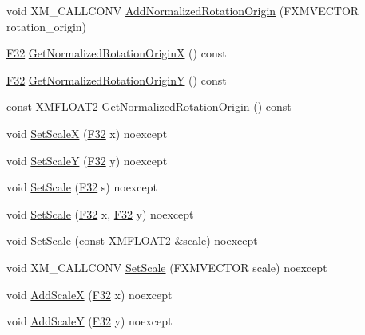 \begin{DoxyCompactItemize}
\item 
void X\+M\+\_\+\+C\+A\+L\+L\+C\+O\+NV \hyperlink{classmage_1_1_sprite_transform_a5571cc3e5700aba23f8c229675f10c3e}{Add\+Normalized\+Rotation\+Origin} (F\+X\+M\+V\+E\+C\+T\+OR rotation\+\_\+origin)
\item 
\hyperlink{namespacemage_aa97e833b45f06d60a0a9c4fc22ae02c0}{F32} \hyperlink{classmage_1_1_sprite_transform_a44a0577d7c136650027da9f5b8a6be77}{Get\+Normalized\+Rotation\+OriginX} () const
\item 
\hyperlink{namespacemage_aa97e833b45f06d60a0a9c4fc22ae02c0}{F32} \hyperlink{classmage_1_1_sprite_transform_afc002a5d0357c2dc638cc166904446d1}{Get\+Normalized\+Rotation\+OriginY} () const
\item 
const X\+M\+F\+L\+O\+A\+T2 \hyperlink{classmage_1_1_sprite_transform_aae811b88ac3cbd5ac18c67ddd81bef99}{Get\+Normalized\+Rotation\+Origin} () const
\item 
void \hyperlink{classmage_1_1_sprite_transform_a2e19b9bffce49955e57094b1eda6af52}{Set\+ScaleX} (\hyperlink{namespacemage_aa97e833b45f06d60a0a9c4fc22ae02c0}{F32} x) noexcept
\item 
void \hyperlink{classmage_1_1_sprite_transform_a98304f37ff1aa359122e9ea08b060415}{Set\+ScaleY} (\hyperlink{namespacemage_aa97e833b45f06d60a0a9c4fc22ae02c0}{F32} y) noexcept
\item 
void \hyperlink{classmage_1_1_sprite_transform_ad11fab7a12f6d1ce79eab12e16adab93}{Set\+Scale} (\hyperlink{namespacemage_aa97e833b45f06d60a0a9c4fc22ae02c0}{F32} s) noexcept
\item 
void \hyperlink{classmage_1_1_sprite_transform_a4f20a52939fc8a7ab285673861d3deae}{Set\+Scale} (\hyperlink{namespacemage_aa97e833b45f06d60a0a9c4fc22ae02c0}{F32} x, \hyperlink{namespacemage_aa97e833b45f06d60a0a9c4fc22ae02c0}{F32} y) noexcept
\item 
void \hyperlink{classmage_1_1_sprite_transform_aa79eda5450bbb7e46f5d51cb3be18276}{Set\+Scale} (const X\+M\+F\+L\+O\+A\+T2 \&scale) noexcept
\item 
void X\+M\+\_\+\+C\+A\+L\+L\+C\+O\+NV \hyperlink{classmage_1_1_sprite_transform_a1e9c60025ebbbaf88fe17af85526f5c8}{Set\+Scale} (F\+X\+M\+V\+E\+C\+T\+OR scale) noexcept
\item 
void \hyperlink{classmage_1_1_sprite_transform_a4f2a1c2dd0da35c0fdf0d43a675be3bc}{Add\+ScaleX} (\hyperlink{namespacemage_aa97e833b45f06d60a0a9c4fc22ae02c0}{F32} x) noexcept
\item 
void \hyperlink{classmage_1_1_sprite_transform_ad2254dc1ae1fc1d9332bd00fed8eb4af}{Add\+ScaleY} (\hyperlink{namespacemage_aa97e833b45f06d60a0a9c4fc22ae02c0}{F32} y) noexcept

\end{DoxyCompactItemize}
